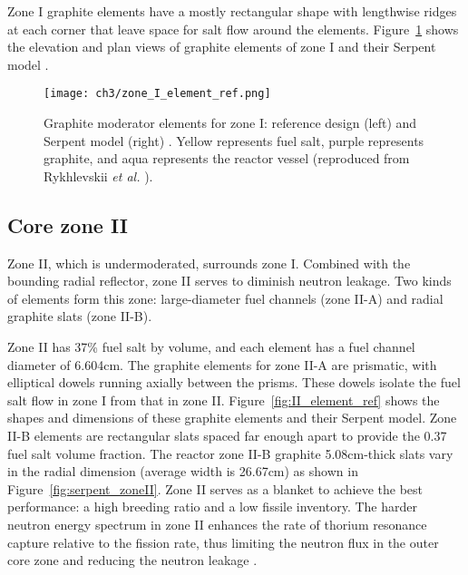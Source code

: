 Zone I graphite elements have a mostly rectangular shape with lengthwise 
ridges at each corner that leave space for salt flow around the elements. 
Figure~\ref{fig:I_element_ref} shows the 
elevation and plan views of graphite elements of zone I 
\cite{robertson_conceptual_1971} and their Serpent model 
\cite{rykhlevskii_full-core_2017}.
\begin{figure}[ht!] %
	\texttt{[image: ch3/zone\_I\_element\_ref.png]}
	\caption{Graphite moderator elements for zone I: reference design (left)
		\cite{robertson_conceptual_1971} and Serpent model (right) 
		\cite{rykhlevskii_full-core_2017}.  Yellow 
		represents fuel salt, purple represents graphite, and aqua represents 
		the reactor vessel (reproduced from Rykhlevskii \emph{et al.} 
		\cite{rykhlevskii_modeling_2019}).}
	\label{fig:I_element_ref}
\end{figure}

\subsection{Core zone II}
Zone II, which is undermoderated, surrounds zone I. Combined with the bounding 
radial reflector, zone II serves to diminish neutron leakage. Two kinds of 
elements form this zone: large-diameter fuel channels (zone II-A) and 
radial graphite slats (zone II-B). 

Zone II has 37\% fuel salt by volume, and each element has a fuel channel 
diameter of 6.604cm. The graphite elements for zone II-A are prismatic, with
elliptical dowels running axially between the prisms. These dowels
isolate the fuel salt flow in zone I from that in zone II.  
Figure~\ref{fig:II_element_ref} shows the shapes and dimensions of these 
graphite elements and their Serpent model. Zone II-B elements are rectangular 
slats spaced far enough apart to provide the 0.37 fuel salt volume fraction. 
The reactor zone II-B graphite 5.08cm-thick slats vary in the radial dimension 
(average width is 26.67cm) as shown in Figure~\ref{fig:serpent_zoneII}. Zone 
II serves as a blanket to achieve the best performance: a high breeding ratio 
and a low fissile inventory. The harder neutron energy spectrum in zone II 
enhances the rate of thorium resonance capture relative to the fission rate, 
thus limiting the neutron flux in the outer core zone and reducing the neutron 
leakage \cite{robertson_conceptual_1971}. 

